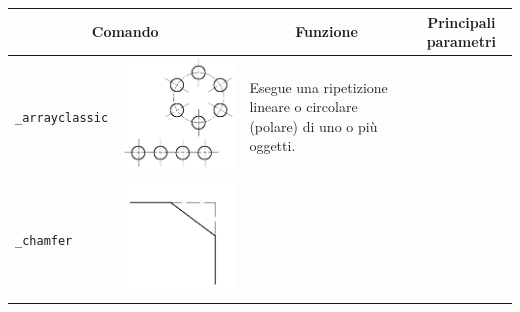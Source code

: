 \documentclass[..]{../IEEEphot}
\begin{document}
\begin{center}
\begin{longtable}{m{.2\linewidth}m{.2\linewidth}m{.25\linewidth}m{.25\linewidth}}
\toprule
    \multicolumn{2}{c}{\bfseries Comando} &
    \multicolumn{1}{c}{\bfseries Funzione} &
    \multicolumn{1}{c}{\bfseries Principali parametri} \\
\midrule
\texttt{\_arrayclassic} & \includegraphics[width = 0.8\linewidth, keepaspectratio]{../images/jpg/_arrayclassic.jpg} & Esegue una ripetizione lineare o circolare (polare) di uno o più oggetti. & 
\\
\midrule
\texttt{\_chamfer} & \includegraphics[width = 0.8\linewidth, keepaspectratio]{../images/jpg/_chamfer.jpg}  

\end{longtable}
\end{center}
\end{document}
